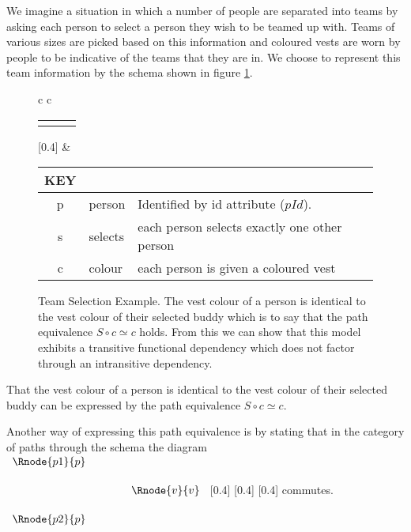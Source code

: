 We imagine a situation in which a number of people are separated into teams by asking each person to select a person they wish to be teamed up with. Teams of various sizes are picked based on this information and coloured vests are worn by people to be indicative of the teams that they are in.
We choose to represent this team information by the schema shown in figure \ref{teamselectionexample}. 

\begin{figure} [h]
\begin{center}
\begin{tabular}{c c}
\begin{tabular}{c p{1.5cm} c}
   \Rnode{p}{p} & & \Rnode{v}{v}
\end{tabular}
[0.4]
\idcomp
& \footnotesize
\begin{tabular}{c p{1.5cm} p{4cm}}
KEY && \\
\hline
p & person & Identified by id attribute ($pId$). \\
s & selects & each person selects exactly one other person \\
c & colour & each person is given a coloured vest 
\end{tabular} 
\end{tabular}
\end{center}
\caption{Team Selection Example. The  vest colour  of a person is 
identical to the vest colour of their selected buddy which is to say that the path equivalence $S \circ c \simeq c$ holds. From this
we can show that this model exhibits a transitive functional dependency which does not factor through an intransitive dependency.
}
\label{teamselectionexample}
\end{figure}

That the  vest colour  of a person is 
identical to the vest colour of their selected buddy can be expressed by the path equivalence $S \circ c \simeq c$. 
\begin{categoricalaside}
Another way of expressing this 
path equivalence is by stating that in the category of paths through the schema  the diagram
$
\begin{array}{c p{0.75cm} c}
   \Rnode{p1}{p}  & &                  \\[0.5cm]
	                 & &    \Rnode{v}{v} \\[0.5cm]
   \Rnode{p2}{p}  & &
			
\end{array}
$
[0.4]
[0.4]
[0.4]
commutes. 
\end{categoricalaside}

